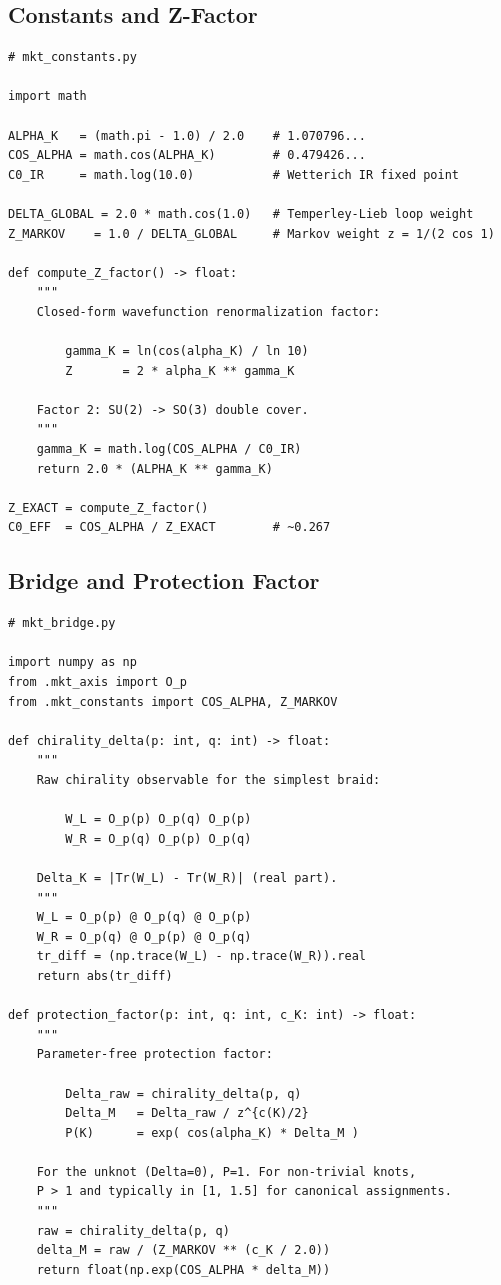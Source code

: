 \documentclass[11pt]{article}
\theoremstyle{remark}
\begin{document}
\subsection{Constants and Z-Factor}

\begin{lstlisting}
# mkt_constants.py

import math

ALPHA_K   = (math.pi - 1.0) / 2.0    # 1.070796...
COS_ALPHA = math.cos(ALPHA_K)        # 0.479426...
C0_IR     = math.log(10.0)           # Wetterich IR fixed point

DELTA_GLOBAL = 2.0 * math.cos(1.0)   # Temperley-Lieb loop weight
Z_MARKOV    = 1.0 / DELTA_GLOBAL     # Markov weight z = 1/(2 cos 1)

def compute_Z_factor() -> float:
    """
    Closed-form wavefunction renormalization factor:

        gamma_K = ln(cos(alpha_K) / ln 10)
        Z       = 2 * alpha_K ** gamma_K

    Factor 2: SU(2) -> SO(3) double cover.
    """
    gamma_K = math.log(COS_ALPHA / C0_IR)
    return 2.0 * (ALPHA_K ** gamma_K)

Z_EXACT = compute_Z_factor()
C0_EFF  = COS_ALPHA / Z_EXACT        # ~0.267
\end{lstlisting}

\subsection{Bridge and Protection Factor}

\begin{lstlisting}
# mkt_bridge.py

import numpy as np
from .mkt_axis import O_p
from .mkt_constants import COS_ALPHA, Z_MARKOV

def chirality_delta(p: int, q: int) -> float:
    """
    Raw chirality observable for the simplest braid:

        W_L = O_p(p) O_p(q) O_p(p)
        W_R = O_p(q) O_p(p) O_p(q)

    Delta_K = |Tr(W_L) - Tr(W_R)| (real part).
    """
    W_L = O_p(p) @ O_p(q) @ O_p(p)
    W_R = O_p(q) @ O_p(p) @ O_p(q)
    tr_diff = (np.trace(W_L) - np.trace(W_R)).real
    return abs(tr_diff)

def protection_factor(p: int, q: int, c_K: int) -> float:
    """
    Parameter-free protection factor:

        Delta_raw = chirality_delta(p, q)
        Delta_M   = Delta_raw / z^{c(K)/2}
        P(K)      = exp( cos(alpha_K) * Delta_M )

    For the unknot (Delta=0), P=1. For non-trivial knots,
    P > 1 and typically in [1, 1.5] for canonical assignments.
    """
    raw = chirality_delta(p, q)
    delta_M = raw / (Z_MARKOV ** (c_K / 2.0))
    return float(np.exp(COS_ALPHA * delta_M))
\end{lstlisting}
\end{document}
